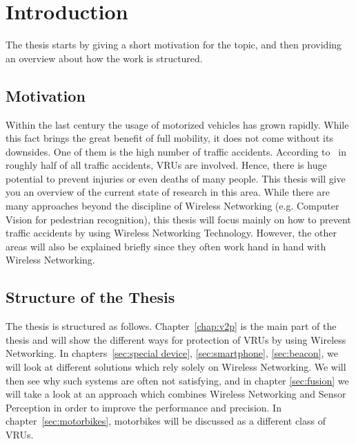 \documentclass[]{ccs-thesis}
\begin{document}
\cleardoublepage
\tableofcontents

\cleardoublepage
{}



\chapter{Introduction}
\label{chap:introduction}

The thesis starts by giving a short motivation for the topic, and then providing an overview about how the work is structured.

\section{Motivation}
\label{sec:motivation}

Within the last century the usage of motorized vehicles has grown rapidly. While this fact brings the great benefit of full mobility, it does not come without its downsides. One of them is the high number of traffic accidents. According to~\cite{v2pcomm} in roughly half of all traffic accidents, \acp{VRU} are involved. Hence, there is huge potential to prevent injuries or even deaths of many people. This thesis will give you an overview of the current state of research in this area. While there are many approaches beyond the discipline of Wireless Networking (e.g. Computer Vision for pedestrian recognition), this thesis will focus mainly on how to prevent traffic accidents by using Wireless Networking Technology. However, the other areas will also be explained briefly since they often work hand in hand with Wireless Networking.

\section{Structure of the Thesis}
\label{sec:structure}

The thesis is structured as follows. Chapter~\ref{chap:v2p} is the main part of the thesis and will show the different ways for protection of \acp{VRU} by using Wireless Networking. In chapters~\ref{sec:special device}, \ref{sec:smartphone}, \ref{sec:beacon}, we will look at different solutions which rely solely on Wireless Networking. We will then see why such systems are often not satisfying, and in chapter \ref{sec:fusion} we will take a look at an approach which combines Wireless Networking and Sensor Perception in order to improve the performance and precision. In chapter~\ref{sec:motorbikes}, motorbikes will be discussed as a different class of \acp{VRU}.
\end{document}
